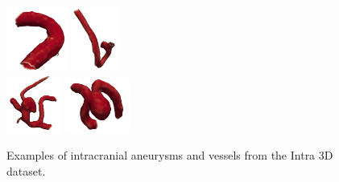 \documentclass[%
 reprint,
 amsmath,amssymb,
 aps,
 floatfix,
 nofootinbib,
]{revtex4-2}
\begin{document}
\begin{figure}[h]
  \centering
  \includegraphics[width=0.18\textwidth]{vessel_intra_1.png}
  \includegraphics[width=0.14\textwidth]{vessel_intra_2.png}\\
  \includegraphics[width=0.16\textwidth]{aneu_intra_2.png}
  \includegraphics[width=0.19\textwidth]{aneu_intra_1.png}
  \caption{Examples of intracranial aneurysms and vessels from the Intra 3D dataset.}
  \label{fig:intra_aneurysms}
\end{figure}
\end{document}
